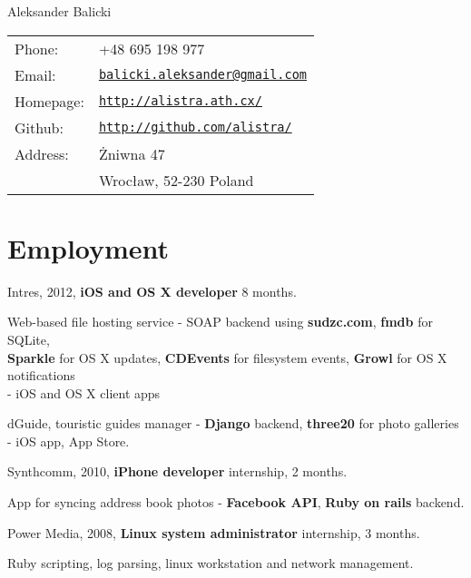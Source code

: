 \documentclass[letterpaper]{article}
\def\name{Aleksander Balicki}
\renewenvironment{itemize}{
  \begin{list}{}{
    \setlength{\leftmargin}{1.5em}
  }
}{
  \end{list}
}
\begin{document}
{\huge \name}


\vspace{0.25in}

\begin{minipage}{0.45\linewidth}
  \begin{tabular}{ll}
    Phone: 	& +48 695 198 977 \\
    Email: 	& \href{mailto:balicki.aleksander@gmail.com}{\tt balicki.aleksander@gmail.com} \\
    Homepage: 	& \href{http://alistra.ath.cx/}{\tt http://alistra.ath.cx/} \\
    Github:     & \href{http://github.com/alistra/}{\tt http://github.com/alistra/}\\
    Address: 	& Żniwna 47\\
    		& Wrocław, 52-230 Poland
  \end{tabular}
\end{minipage}

\section*{Employment}

\begin{itemize}


	\item Intres, 2012, {\bf iOS and OS X developer} 8 months.
		\begin{itemize}
		    \item Web-based file hosting service - SOAP backend using {\bf sudzc.com}, {\bf fmdb} for SQLite,\\
			{\bf Sparkle} for OS X updates, {\bf CDEvents} for filesystem events, {\bf Growl} for OS X notifications \\
				- iOS and OS X client apps
			\item dGuide, touristic guides manager - {\bf Django} backend, {\bf three20} for photo galleries \\
				- iOS app, App Store.
		\end{itemize}
	\item Synthcomm, 2010, {\bf iPhone developer} internship, 2 months.
		\begin{itemize}
			\item App for syncing address book photos - {\bf Facebook API}, {\bf Ruby on rails} backend.
		\end{itemize}
	\item Power Media, 2008, {\bf Linux system administrator} internship, 3 months.
		\begin{itemize}
			\item Ruby scripting, log parsing, linux workstation and network management.
		\end{itemize}
\end{itemize}
\end{document}
